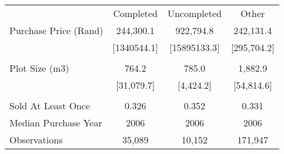 \begin{tabu}{lccc}
\toprule
 & Completed & Uncompleted & Other  \\
 Purchase Price (Rand)  & 244,300.1  & 922,794.8  & 242,131.4  \\ 
\rowfont{\footnotesize} & [1340544.1]  & [15895133.3]  & [295,704.2]  \\ 
 &  &  &  \\ 
 Plot Size (m3)  & 764.2  & 785.0  & 1,882.9  \\ 
\rowfont{\footnotesize} & [31,079.7]  & [4,424.2]  & [54,814.6]  \\ 
 &  &  &  \\ 
 Sold At Least Once  & 0.326  & 0.352  & 0.331  \\ 
 Median Purchase Year  & 2006  & 2006  & 2006  \\ 
\midrule
 Observations  & 35,089  & 10,152  & 171,947  \\ 
\bottomrule
\end{tabu}
